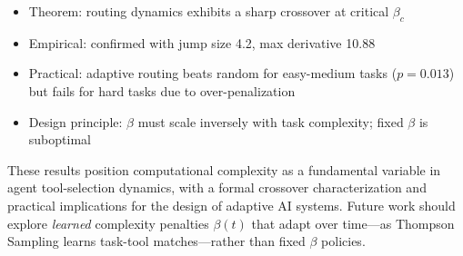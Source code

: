 \documentclass[12pt]{article}
\theoremstyle{definition}
\begin{document}
\begin{itemize}
  \item Theorem: routing dynamics exhibits a sharp crossover at critical $\beta_c$
  \item Empirical: confirmed with jump size 4.2, max derivative 10.88
  \item Practical: adaptive routing beats random for easy-medium tasks ($p=0.013$) but fails for hard tasks due to over-penalization
  \item Design principle: $\beta$ must scale inversely with task complexity; fixed $\beta$ is suboptimal
\end{itemize}

These results position computational complexity as a fundamental variable in agent tool-selection dynamics, with a formal crossover characterization and practical implications for the design of adaptive AI systems. Future work should explore \emph{learned} complexity penalties $\beta(t)$ that adapt over time---as Thompson Sampling learns task-tool matches---rather than fixed $\beta$ policies.
\end{document}

